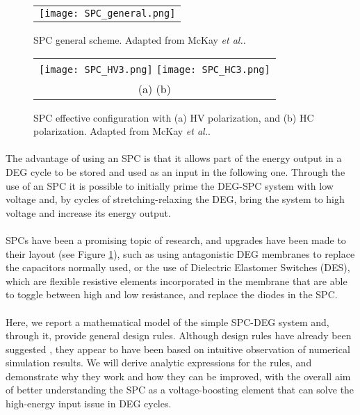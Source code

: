 \begin{figure}[ht]
\begin{center}
\begin{tabular}{c}
\texttt{[image: SPC\_general.png]}
\end{tabular}
\end{center}
\caption 
{ \label{fig:spc}
SPC general scheme. Adapted from McKay \textit{et al.}\cite{SPCdesign}. } 
\end{figure} 

\begin{figure}[ht]
\begin{center}
\begin{tabular}{c}
\texttt{[image: SPC\_HV3.png]}
\texttt{[image: SPC\_HC3.png]}\\
(a) \hspace{7cm} (b)
\end{tabular}
\end{center}
\caption 
{ \label{fig:spc_form}
SPC effective configuration with (a) HV polarization, and (b) HC polarization. Adapted from McKay \textit{et al.}\cite{SPCdesign}.} 
\end{figure} 

\paragraph{} The advantage of using an SPC is that it allows part of the energy output in a DEG cycle to be stored and used as an input in the following one. Through the use of an SPC it is possible to initially prime the DEG-SPC system with low voltage and, by cycles of stretching-relaxing the DEG, bring the system to high voltage and increase its energy output.

\paragraph{}SPCs have been a promising topic of research, and upgrades have been made to their layout (see Figure \ref{fig:spc}), such as using antagonistic DEG membranes to replace the capacitors normally used\cite{AntagSPC}, or the use of Dielectric Elastomer Switches (DES), which are flexible resistive  elements incorporated in the membrane that are able to toggle between high and low resistance, and replace the diodes in the SPC\cite{DESSPC}.

\paragraph{}Here, we report a mathematical model of the simple SPC-DEG system and, through it, provide general design rules. Although design rules have already been suggested \cite{SPCdesign}, they appear to have been based on intuitive observation of numerical simulation results. We will derive analytic expressions for the rules, and demonstrate why they work and how they can be improved, with the overall aim of better understanding the SPC as a voltage-boosting element that can solve the high-energy input issue in DEG cycles.

